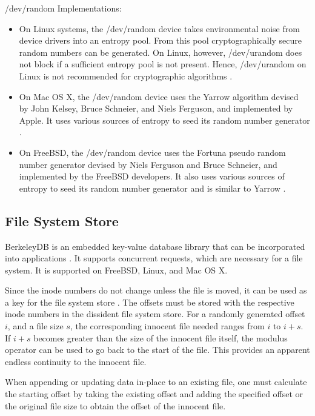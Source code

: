 \documentclass[10pt,twocolumn]{article}
\begin{document}
/dev/random Implementations: 
\begin{itemize}
\item On Linux systems, the /dev/random device takes environmental noise from device drivers into an entropy pool. From this pool cryptographically secure random numbers can be generated.  On Linux, however, /dev/urandom does not block if a sufficient entropy pool is not present. Hence, /dev/urandom on Linux is not recommended for cryptographic algorithms \cite{linuxrandom}. 
\item On Mac OS X, the /dev/random device uses the Yarrow algorithm devised by John Kelsey, Bruce Schneier, and Niels Ferguson, and implemented by Apple. It uses various sources of entropy to seed its random number generator \cite{yarrow}. 
\item On FreeBSD, the /dev/random device uses the Fortuna pseudo random number generator devised by Niels Ferguson and Bruce Schneier, and implemented by the FreeBSD developers. It also uses various sources of entropy to seed its random number generator and is similar to Yarrow \cite{fortuna}. 
\end{itemize}

\subsection{File System Store}

BerkeleyDB is an embedded key-value database library that can be incorporated into applications \cite{berkeleydb}. It supports concurrent requests, which are necessary for a file system. It is supported on FreeBSD, Linux, and Mac OS X. 

Since the inode numbers do not change unless the file is moved, it can be used as a key for the file system store \cite{astmos}. The offsets must be stored with the respective inode numbers in the dissident file system store. For a randomly generated offset $i$, and a file size $s$, the corresponding innocent file needed ranges from $i$ to $i + s$. If $i + s$ becomes greater than the size of the innocent file itself, the modulus operator can be used to go back to the start of the file. This provides an apparent endless continuity to the innocent file. 

When appending or updating data in-place to an existing file, one must calculate the starting offset by taking the existing offset and adding the specified offset or the original file size to obtain the offset of the innocent file. 
\end{document}
